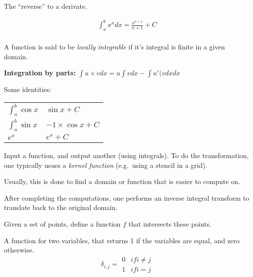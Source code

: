 \begin{definition}[Integral]
    The ``reverse'' to a derivate. 

    \begin{align}
        \int_{a}^{b}x^{n} dx = \frac{x^{n+1}}{n+1} + C \\
    \end{align}

    A function is said to be \textit{locally integrable} if it's integral is 
    finite in a given domain.

    \textbf{Integration by parts:} $\int{u \times v dx} = u\int{v dx} - \int{u\prime{(v dx}}dx $

    Some identities:
    \begin{longtable}{|l|l|}
        $\int_{a}^{b}\cos{x} $ & $\sin{x} + C $ \\
    $\int_{a}^{b}\sin{x}$ & $-1 \times \cos{x} + C $\\
    $e^{x}$ & $e^{x} + C $
    \end{longtable}

\end{definition}

\begin{definition}\label{inttrans}
    Input a function, and output another (using integrals).
    To do the transformation, one typically usues a \textit{kernel function} (e.g.\ 
    using a stencil in a grid).

    Usually, this is done to find a domain or function that is easier to compute
    on. 

    After completing the computations, one performs an inverse integral transform
    to translate back to the original domain.
\end{definition}

\begin{definition}
    Given a set of points, define a function $f$ that intersects these points.
\end{definition}

\begin{definition}
    A function for two variables, that returns 1 if the variables are equal,
    and zero otherwise.
    $$
    \delta_{i,j} = \begin{array}{ll}
        0 & if i \neq j \\
        1 & if i = j
        \end{array}
    $$
\end{definition}

